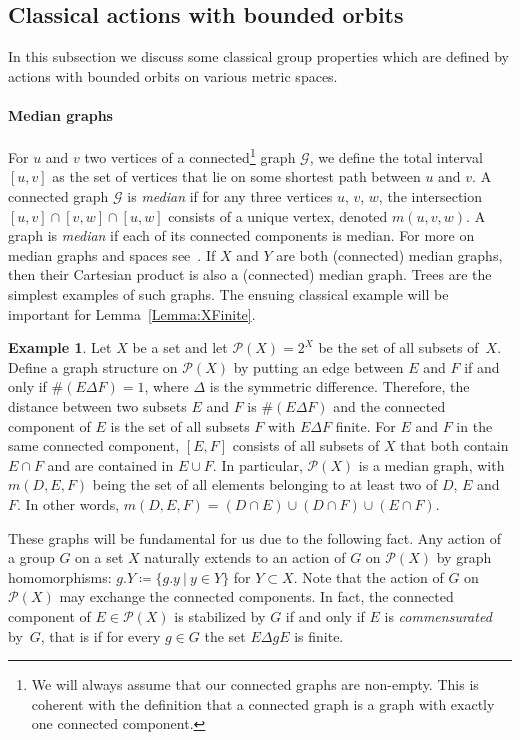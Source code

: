 \documentclass[a4paper]{article}
\theoremstyle{definition}
\newtheorem{exmp}[lem]{Example}
\newcommand{\setst}[2]{\{#1\ |\ #2\}}
\newcommand*{\powerset}[1]{\mathcal P(#1)}
\begin{document}
\subsection{Classical actions with bounded orbits}
%
%
%
In this subsection we discuss some classical group properties which are defined by actions with bounded orbits on various metric spaces.

\paragraph{Median graphs}
For $u$ and $v$ two vertices of a connected\footnote{We will always assume that our connected graphs are non-empty. This is coherent with the definition that a connected graph is a graph with exactly one connected component.} graph $\mathcal G$, we define the total interval $[u,v]$ as the set of vertices that lie on some shortest path between $u$ and $v$.
A connected graph $\mathcal G$ is \emph{median} if for any three vertices $u$, $v$, $w$, the intersection $[u,v]\cap[v,w]\cap[u,w]$ consists of a unique vertex, denoted $m(u,v,w)$.
A graph is \emph{median} if each of its connected components is median. For more on median graphs and spaces see~\cite{MR2405677,MR2671183,MR1705337}.
If $X$ and $Y$ are both (connected) median graphs, then their Cartesian product is also a (connected) median graph.
Trees are the simplest examples of such graphs.
The ensuing classical example will be important for Lemma~\ref{Lemma:XFinite}.
%
%
\begin{exmp}\label{Ex:MainMedian}
Let $X$ be a set and let  $\powerset{X}=2^X$ be the set of all subsets of~$X$.
Define a graph structure on $\powerset{X}$ by putting an edge between $E$ and $F$ if and only if $\#(E\Delta F)=1$, where $\Delta$ is the symmetric difference.
Therefore, the distance between two subsets $E$ and $F$ is $\#(E\Delta F)$ and
the connected component of $E$ is the set of all subsets $F$ with $E\Delta F$ finite.
For $E$ and $F$ in the same connected component, $[E,F]$ consists of all subsets of $X$ that both contain $E\cap F$ and are contained in $E\cup F$.
In particular, $\powerset{X}$ is a median graph, with $m(D,E,F)$ being the set of all elements belonging to at least two of $D$, $E$ and~$F$. In other words, $m(D,E,F)=(D\cap E)\cup(D\cap F)\cup(E\cap F)$.
\end{exmp}
%
%

These graphs will be fundamental for us due to the following fact.
Any action of a group $G$ on a set $X$ naturally extends to an action of $G$ on $\powerset{X}$ by graph homomorphisms: $g.Y\coloneqq\setst{g.y}{y\in Y}$ for $Y\subset X$.
Note that the action of $G$ on $\powerset{X}$ may exchange the connected components.
In fact, the connected component of $E\in \powerset{X}$ is stabilized by $G$ if and only if $E$ is \emph{commensurated} by~$G$, that is if for every $g\in G$ the set $E\Delta gE$ is finite.
%
%
%
%
\end{document}
